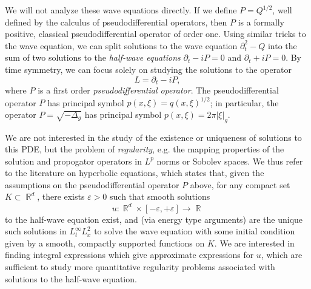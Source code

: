 \documentclass{article}
\theoremstyle{plain}
\theoremstyle{remark}
\theoremstyle{definition}
\DeclareMathOperator{\RR}{\mathbb{R}}
\begin{document}
We will not analyze these wave equations directly. If we define $P = Q^{1/2}$, well defined by the calculus of pseudodifferential operators, then $P$ is a formally positive, classical pseudodifferential operator of order one. Using similar tricks to the wave equation, we can split solutions to the wave equation $\partial_t^2 - Q$ into the sum of two solutions to the \emph{half-wave equations} $\partial_t - i P = 0$ and $\partial_t + i P = 0$. By time symmetry, we can focus solely on studying the solutions to the operator
%
\[ L = \partial_t - i P, \]
%
where $P$ is a first order \emph{pseudodifferential operator}. The pseudodifferential operator $P$ has principal symbol $p(x,\xi) = q(x,\xi)^{1/2}$; in particular, the operator $P = \sqrt{-\Delta_g}$ has principal symbol $p(x,\xi) = 2 \pi |\xi|_g$.

We are not interested in the study of the existence or uniqueness of solutions to this PDE, but the problem of \emph{regularity}, e.g. the mapping properties of the solution and propogator operators in $L^p$ norms or Sobolev spaces. We thus refer to the literature on hyperbolic equations, which states that, given the assumptions on the pseudodifferential operator $P$ above, for any compact set $K \subset \RR^d$, there exists $\varepsilon > 0$ such that smooth solutions
%
\[ u: \RR^d \times [-\varepsilon,+\varepsilon] \to \RR \]
%
to the half-wave equation exist, and (via energy type arguments) are the unique such solutions in $L^\infty_t L^2_x$ to solve the wave equation with some initial condition given by a smooth, compactly supported functions on $K$. We are interested in finding integral expressions which give approximate expressions for $u$, which are sufficient to study more quantitative regularity problems associated with solutions to the half-wave equation.

\begin{comment}
For such an operator, we can find a countable, orthogonal basis $\{ e_\lambda : \lambda \geq 0 \}$ of $L^2(M)$, such that $Pe_\lambda = \lambda e_\lambda$, and such that for each $\lambda$, $e_\lambda$ is a smooth function, with $L^2_s$ norm $O_s(\lambda^s)$. The number of elements of this basis with eigenvalue at most $\lambda$ is $O(1 + \lambda^d)$. Given this basis, we can define a family of bounded operators $\{ e^{2 \pi itP} \}$ on $L^2(M)$ by setting $e^{2 \pi it P} e_\lambda = e^{2 \pi it \lambda} e_\lambda$, and then consider a solution operator
%
\[ (Wf)(x,t) = (e^{2 \pi it \lambda} f)(x). \]
%
Using the $L^2_s$ norm properties of the eigenfunctions $\{ e_\lambda \}$, and the fact that for any $f \in C^\infty(M)$,
%
\[ \langle f, e_\lambda \rangle \lesssim_N \lambda^{-N} \quad\text{for all $N > 0$,} \]
%
it is simple to check that $W$ maps $C^\infty(M)$ into $C^\infty_{\text{loc}}(M \times \RR)$, and that for $f \in C^\infty(M)$, the smooth function $u = Wf$ solves the equation $Lu = 0$ with initial conditions $f$. One can also prove the uniqueness of solution solutions, e.g. using energy estimates, but this takes us a little far afield of what we want to talk about in these notes.
\end{comment}
\end{document}
